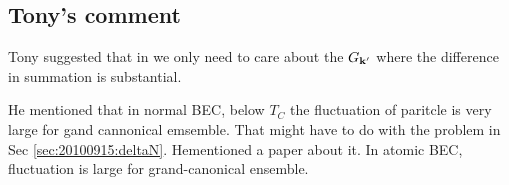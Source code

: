\subsection{Tony's comment\label{sec:20100915:tony}}
Tony suggested that in  we only need to care about the $G_{\mathbf{k}'}$ where the difference in summation is substantial.  

He mentioned that in normal BEC, below $T_{C}$ the fluctuation of paritcle is very large for gand cannonical emsemble.  That might have to do with the problem in Sec \ref{sec:20100915:deltaN}.
Hementioned a paper \cite{Politzer} about it.  In atomic BEC, fluctuation is large for grand-canonical ensemble.  
